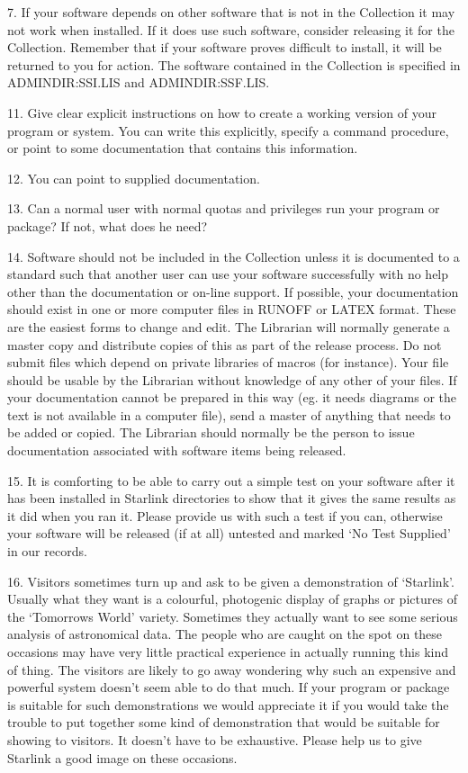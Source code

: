7. If your software depends on other software that is not in the Collection it
may not work when installed.
If it does use such software, consider releasing it for the Collection.
Remember that if your software proves difficult to install, it will be returned
to you for action.
The software contained in the Collection is specified in ADMINDIR:SSI.LIS and
ADMINDIR:SSF.LIS.

11. Give clear explicit instructions on how to create a working version of your
program or system.
You can write this explicitly, specify a command procedure, or point to some
documentation that contains this information.

12. You can point to supplied documentation.

13. Can a normal user with normal quotas and privileges run your program or
package?
If not, what does he need?

14. Software should not be included in the Collection unless it is documented
to a standard such that another user can use your software successfully with no
help other than the documentation or on-line support.
If possible, your documentation should exist in one or more computer files in
RUNOFF or LATEX format.
These are the easiest forms to change and edit.
The Librarian will normally generate a master copy and distribute copies of this
as part of the release process.
Do not submit files which depend on private libraries of macros (for instance).
Your file should be usable by the Librarian without knowledge of any other of
your files.
If your documentation cannot be prepared in this way (eg. it needs diagrams or
the text is not available in a computer file), send a master of anything that
needs to be added or copied.
The Librarian should normally be the person to issue documentation associated
with software items being released.

15. It is comforting to be able to carry out a simple test on your software
after it has been installed in Starlink directories to show that it gives the
same results as it did when you ran it.
Please provide us with such a test if you can, otherwise your software will be
released (if at all) untested and marked `No Test Supplied' in our records.

16. Visitors sometimes turn up and ask to be given a demonstration of
`Starlink'.
Usually what they want is a colourful, photogenic display of graphs or pictures
of the `Tomorrows World' variety.
Sometimes they actually want to see some serious analysis of astronomical data.
The people who are caught on the spot on these occasions may have very little
practical experience in actually running this kind of thing.
The visitors are likely to go away wondering why such an expensive and powerful
system doesn't seem able to do that much.
If your program or package is suitable for such demonstrations we would
appreciate it if you would take the trouble to put together some kind of
demonstration that would be suitable for showing to visitors.
It doesn't have to be exhaustive.
Please help us to give Starlink a good image on these occasions.

